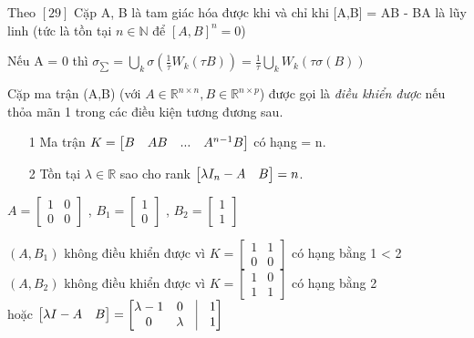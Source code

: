  \begin{note} Theo $[29]$
  Cặp A, B là tam giác hóa được khi và chỉ khi [A,B] = AB - BA là lũy linh (tức là tồn tại $n \in \mathbb{N}$ để $[A,B]^{n} = 0$)  \\
 \end{note}	
 \begin{hq}
 Nếu A = 0 thì $\sigma_{\sum} = \displaystyle \bigcup_{k}\sigma(\frac{1}{\tau}W_{k}(\tau B)) = \frac{1}{\tau}\displaystyle \bigcup_{k}W_{k}(\tau \sigma(B))$
 \end{hq}
 \begin{dn}
 Cặp ma trận (A,B) (với $A \in \mathbb{R}^{n \times n}, B \in \mathbb{R}^{n \times p}$) được gọi là \emph{điều khiển được} nếu thỏa mãn 1 trong các điều kiện tương đương sau.
 \begin{enumerate}
\item[1] Ma trận $K = \begin{bmatrix} B & AB & ... & A^{n-1}B \end{bmatrix}$ có hạng = n.
\item[2] Tồn tại $\lambda \in \mathbb{R}$ sao cho rank 
$\begin{bmatrix} \lambda I_{n}-A & B \end{bmatrix} = n$.
 \end{enumerate}
 \end{dn}
 \begin{vd}
 $A = \begin{bmatrix}
 		1 & 0 \\
 		0 & 0
 	  \end{bmatrix}$ ,
 $B_{1} = \begin{bmatrix}
 			1 \\
 			0
 		  \end{bmatrix}$ ,
 $B_{2}= \begin{bmatrix}
 			1 \\
 			1
         \end{bmatrix}$ \\
 \end{vd}
 $(A,B_{1})$ không điều khiển được vì $K = \begin{bmatrix}
 											1 & 1\\
 											0 & 0
 										   \end{bmatrix}$
 có hạng bằng 1 < 2 \\
 $(A,B_{2})$ không điều khiển được vì $K = \begin{bmatrix}
 											1 & 0\\
 											1 & 1
 										   \end{bmatrix}$
 có hạng bằng 2 \\
 hoặc $\m{\lambda I-A   & B} = 
\m{ \lambda - 1 & 0 & \vline &1 \\
         	 0  & \lambda & \vline &1
 						  }$
